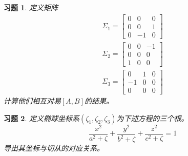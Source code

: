 \documentclass{ctexart}
\numberwithin{equation}{subsection}
\numberwithin{theorem}{subsection}
\numberwithin{definition}{subsection}
\numberwithin{proof}{subsection}
\numberwithin{lemma}{subsection}
\numberwithin{example}{subsection}
\numberwithin{remark}{subsection}
\numberwithin{corollary}{subsection}
\newtheorem{exercise}   {习题}
\numberwithin{exercise}{subsection}
\numberwithin{problem}{subsection}
\numberwithin{question}{section}
\numberwithin{method}{subsection}
\begin{document}
    \begin{exercise}
        定义矩阵
        \begin{equation}
            \begin{aligned}
                \Sigma_1 = \begin{bmatrix}
                    0 & 0 & 0 \\
                    0 & 0 & 1 \\
                    0 & -1 & 0
                \end{bmatrix} \\
                \Sigma_2 = \begin{bmatrix}
                    0 & 0 & -1 \\
                    0 & 0 & 0 \\
                    1 & 0 & 0
                \end{bmatrix} \\
                \Sigma_3 = \begin{bmatrix}
                    0 & 1 & 0 \\
                    -1 & 0 & 0 \\
                    0 & 0 & 0
                \end{bmatrix}
            \end{aligned}
        \end{equation}
        计算他们相互对易$[A,B]$的结果。
    \end{exercise}
    
    \begin{exercise}
        定义椭球坐标系$(\zeta_1,\zeta_2,\zeta_3)$为下述方程的三个根。
        \begin{equation}
            \frac{x^2}{a^2+\zeta} + \frac{y^2}{b^2+\zeta} + \frac{z^2}{c^2+\zeta} = 1
        \end{equation}
        导出其坐标与切从的对应关系。
    \end{exercise}
\end{document}
